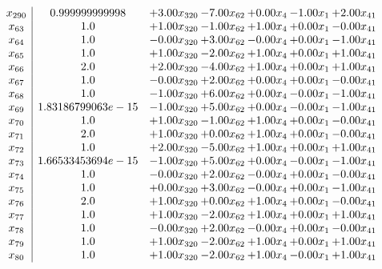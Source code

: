 \documentclass[8pt]{article}
\begin{document}
\[\begin{array}{c| c c@{\hskip 2pt} c@{\hskip 2pt} c@{\hskip 2pt} c@{\hskip 2pt} c@{\hskip 2pt} }
 x_{290}   &  0.999999999998 & +  3.00 x_{320} & -7.00 x_{62} & +  0.00 x_{4} & -1.00 x_{1} & +  2.00 x_{41}\\
 x_{63}   &  1.0 & +  1.00 x_{320} & -1.00 x_{62} & +  1.00 x_{4} & +  0.00 x_{1} & -0.00 x_{41}\\
 x_{64}   &  1.0 & -0.00 x_{320} & +  3.00 x_{62} & -0.00 x_{4} & +  0.00 x_{1} & -1.00 x_{41}\\
 x_{65}   &  1.0 & +  1.00 x_{320} & -2.00 x_{62} & +  1.00 x_{4} & +  0.00 x_{1} & +  1.00 x_{41}\\
 x_{66}   &  2.0 & +  2.00 x_{320} & -4.00 x_{62} & +  1.00 x_{4} & +  0.00 x_{1} & +  1.00 x_{41}\\
 x_{67}   &  1.0 & -0.00 x_{320} & +  2.00 x_{62} & +  0.00 x_{4} & +  0.00 x_{1} & -0.00 x_{41}\\
 x_{68}   &  1.0 & -1.00 x_{320} & +  6.00 x_{62} & +  0.00 x_{4} & -0.00 x_{1} & -1.00 x_{41}\\
 x_{69}   &  1.83186799063e-15 & -1.00 x_{320} & +  5.00 x_{62} & +  0.00 x_{4} & -0.00 x_{1} & -1.00 x_{41}\\
 x_{70}   &  1.0 & +  1.00 x_{320} & -1.00 x_{62} & +  1.00 x_{4} & +  0.00 x_{1} & -0.00 x_{41}\\
 x_{71}   &  2.0 & +  1.00 x_{320} & +  0.00 x_{62} & +  1.00 x_{4} & +  0.00 x_{1} & -0.00 x_{41}\\
 x_{72}   &  1.0 & +  2.00 x_{320} & -5.00 x_{62} & +  1.00 x_{4} & +  0.00 x_{1} & +  1.00 x_{41}\\
 x_{73}   &  1.66533453694e-15 & -1.00 x_{320} & +  5.00 x_{62} & +  0.00 x_{4} & -0.00 x_{1} & -1.00 x_{41}\\
 x_{74}   &  1.0 & -0.00 x_{320} & +  2.00 x_{62} & -0.00 x_{4} & +  0.00 x_{1} & -0.00 x_{41}\\
 x_{75}   &  1.0 & +  0.00 x_{320} & +  3.00 x_{62} & -0.00 x_{4} & +  0.00 x_{1} & -1.00 x_{41}\\
 x_{76}   &  2.0 & +  1.00 x_{320} & +  0.00 x_{62} & +  1.00 x_{4} & +  0.00 x_{1} & -0.00 x_{41}\\
 x_{77}   &  1.0 & +  1.00 x_{320} & -2.00 x_{62} & +  1.00 x_{4} & +  0.00 x_{1} & +  1.00 x_{41}\\
 x_{78}   &  1.0 & -0.00 x_{320} & +  2.00 x_{62} & -0.00 x_{4} & +  0.00 x_{1} & -0.00 x_{41}\\
 x_{79}   &  1.0 & +  1.00 x_{320} & -2.00 x_{62} & +  1.00 x_{4} & +  0.00 x_{1} & +  1.00 x_{41}\\
 x_{80}   &  1.0 & +  1.00 x_{320} & -2.00 x_{62} & +  1.00 x_{4} & -0.00 x_{1} & +  1.00 x_{41}\\

\end{array}\]
\end{document}
